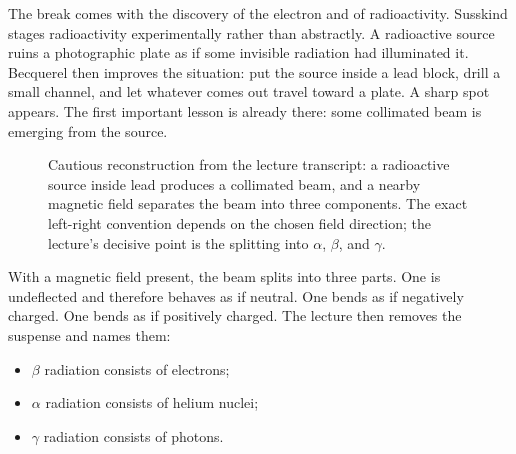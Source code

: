 The break comes with the discovery of the electron and of radioactivity. Susskind stages radioactivity experimentally rather than abstractly. A radioactive source ruins a photographic plate as if some invisible radiation had illuminated it. Becquerel then improves the situation: put the source inside a lead block, drill a small channel, and let whatever comes out travel toward a plate. A sharp spot appears. The first important lesson is already there: some collimated beam is emerging from the source.

\begin{figure}[htbp]
\centering
{}
\caption{Cautious reconstruction from the lecture transcript: a radioactive source inside lead produces a collimated beam, and a nearby magnetic field separates the beam into three components. The exact left-right convention depends on the chosen field direction; the lecture's decisive point is the splitting into \(\alpha\), \(\beta\), and \(\gamma\).}
\end{figure}

With a magnetic field present, the beam splits into three parts. One is undeflected and therefore behaves as if neutral. One bends as if negatively charged. One bends as if positively charged. The lecture then removes the suspense and names them:

\begin{itemize}
\item \(\beta\) radiation consists of electrons;
\item \(\alpha\) radiation consists of helium nuclei;
\item \(\gamma\) radiation consists of photons.
\end{itemize}

